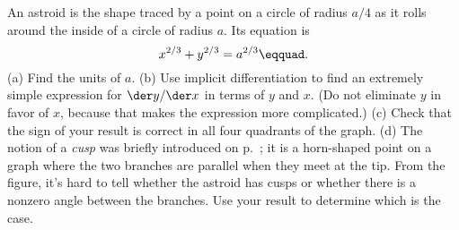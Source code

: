 An astroid is the shape traced by a point on a circle of radius $a/4$ as it rolls
around the inside of a circle of radius $a$. Its equation is
\begin{equation*}
  x^{2/3}+y^{2/3} = a^{2/3}\eqquad.
\end{equation*}
(a) Find the units of $a$.
(b) Use implicit differentiation to find
an extremely simple expression for $\der y/\der x$ in terms of $y$ and $x$.
(Do not eliminate $y$ in favor of $x$, because that makes the expression more complicated.)
(c) Check that the sign of your result is correct in all four quadrants of the graph.
(d) The notion of a \emph{cusp} was briefly introduced on p.~\pageref{fig:caustic};
it is a horn-shaped point on a graph where the two branches are parallel when they
meet at the tip. From the figure, it's hard to tell whether the astroid has cusps
or whether there is a nonzero angle between the branches. Use your result to determine
which is the case.
